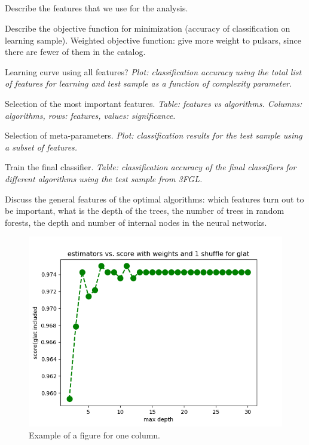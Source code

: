 \subsection{}


\ben
\item
Describe the features that we use for the analysis.
\item
Describe the objective function for minimization (accuracy of classification on learning sample).
Weighted objective function: give more weight to pulsars, since there are fewer of them in the catalog.
\item
Learning curve using all features?
{\it Plot: classification accuracy using the total list of features for learning and test sample as a function of complexity parameter.}
\item
Selection of the most important features.
{\it Table: features vs algorithms. Columns: algorithms, rows: features, values: significance.}
\item
Selection of meta-parameters.
{\it Plot: classification results for the test sample using a subset of features.}
\item
Train the final classifier.
{\it Table: classification accuracy of the final classifiers for different algorithms using the test sample from 3FGL.}
\een

Discuss the general features of the optimal algorithms: which features turn out to be important, what is the depth of the trees, the number of trees in random forests, the depth and number of internal nodes in the neural networks. 

\begin{figure}[h]
\includegraphics[width=\onepic\textwidth]{plots/Rf_maxdepth_oobscore_glat}
\caption{
Example of a figure for one column.
}
\label{fig:Maps_data}
\end{figure}


